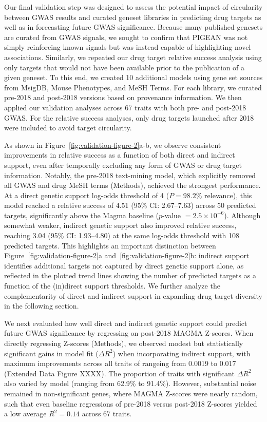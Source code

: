 Our final validation step was designed to assess the potential impact of circularity between GWAS results and curated geneset libraries in predicting drug targets as well as in forecasting future GWAS significance. Because many published genesets are curated from GWAS signals, we sought to confirm that PIGEAN was not simply reinforcing known signals but was instead capable of highlighting novel associations. Similarly, we repeated our drug target relative success analysis using only targets that would not have been available prior to the publication of a given geneset. To this end, we created 10 additional models using gene set sources from MsigDB, Mouse Phenotypes, and MeSH Terms. For each library, we curated pre-2018 and post-2018 versions based on provenance information. We then applied our validation analyses across 67 traits with both pre- and post-2018 GWAS. For the relative success analyses, only drug targets launched after 2018 were included to avoid target circularity.  

As shown in Figure~\ref{fig:validation-figure-2}a-b, we observe consistent improvements in relative success as a function of both direct and indirect support, even after temporally excluding any form of GWAS or drug target information. Notably, the pre-2018 text-mining model, which explicitly removed all GWAS and drug MeSH terms (Methods), achieved the strongest performance. At a direct genetic support log-odds threshold of 4 ($P=98.2\%$ relevance), this model reached a relative success of 4.51 (95\% CI: 2.67–7.63) across 50 predicted targets, significantly above the Magma baseline ($p$-value $=2.5\times 10^{-6}$). Although somewhat weaker, indirect genetic support also improved relative success, reaching 3.04 (95\% CI: 1.93–4.80) at the same log-odds threshold with 108 predicted targets. This highlights an important distinction between Figure~\ref{fig:validation-figure-2}a and~\ref{fig:validation-figure-2}b: indirect support identifies additional targets not captured by direct genetic support alone, as reflected in the plotted trend lines showing the number of predicted targets as a function of the (in)direct support thresholds. We further analyze the complementarity of direct and indirect support in expanding drug target diversity in the following section.  

We next evaluated how well direct and indirect genetic support could predict future GWAS significance by regressing on post-2018 MAGMA Z-scores. When directly regressing Z-scores (Methods), we observed modest but statistically significant gains in model fit ($\Delta R^2$) when incorporating indirect support, with maximum improvements across all traits of rangeing from 0.0019 to 0.017 (Extended Data Figure XXXX). The proportion of traits with significant $\Delta R^2$ also varied by model (ranging from 62.9\% to 91.4\%). However, substantial noise remained in non-significant genes, where MAGMA Z-scores were nearly random, such that even baseline regressions of pre-2018 versus post-2018 Z-scores yielded a low average $R^2 = 0.14$ across 67 traits.  

